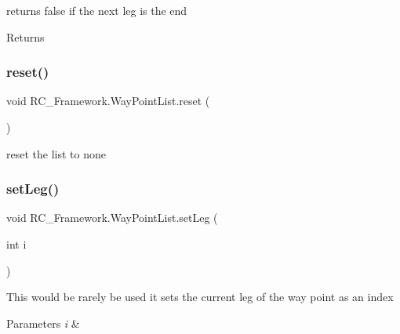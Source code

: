 returns false if the next leg is the end ~\newline


\begin{DoxyReturn}{Returns}

\end{DoxyReturn}
\mbox{\label{class_r_c___framework_1_1_way_point_list_a36f22f05e0d900f4acc2a7a8239b2227}} 
\subsubsection{\texorpdfstring{reset()}{reset()}}
{\footnotesize\ttfamily void R\+C\+\_\+\+Framework.\+Way\+Point\+List.\+reset (\begin{DoxyParamCaption}{ }\end{DoxyParamCaption})}



reset the list to none 

\mbox{\label{class_r_c___framework_1_1_way_point_list_ada4f7ff83ceacd5494f4ed71e8301c4d}} 
\subsubsection{\texorpdfstring{set\+Leg()}{setLeg()}}
{\footnotesize\ttfamily void R\+C\+\_\+\+Framework.\+Way\+Point\+List.\+set\+Leg (\begin{DoxyParamCaption}\item[{int}]{i }\end{DoxyParamCaption})}



This would be rarely be used it sets the current leg of the way point as an index 


\begin{DoxyParams}{Parameters}
{\em i} & \\
\hline
\end{DoxyParams}


